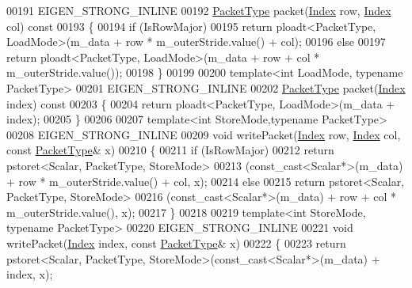 \begin{DoxyCode}
00191   EIGEN\_STRONG\_INLINE
00192   \hyperlink{struct_eigen_1_1_packet_type}{PacketType} packet(\hyperlink{namespace_eigen_a62e77e0933482dafde8fe197d9a2cfde}{Index} row, \hyperlink{namespace_eigen_a62e77e0933482dafde8fe197d9a2cfde}{Index} col)\textcolor{keyword}{ const}
00193 \textcolor{keyword}{  }\{
00194     \textcolor{keywordflow}{if} (IsRowMajor)
00195       \textcolor{keywordflow}{return} ploadt<PacketType, LoadMode>(m\_data + row * m\_outerStride.value() + col);
00196     \textcolor{keywordflow}{else}
00197       \textcolor{keywordflow}{return} ploadt<PacketType, LoadMode>(m\_data + row + col * m\_outerStride.value());
00198   \}
00199 
00200   \textcolor{keyword}{template}<\textcolor{keywordtype}{int} LoadMode, \textcolor{keyword}{typename} PacketType>
00201   EIGEN\_STRONG\_INLINE
00202   \hyperlink{struct_eigen_1_1_packet_type}{PacketType} packet(\hyperlink{namespace_eigen_a62e77e0933482dafde8fe197d9a2cfde}{Index} index)\textcolor{keyword}{ const}
00203 \textcolor{keyword}{  }\{
00204     \textcolor{keywordflow}{return} ploadt<PacketType, LoadMode>(m\_data + index);
00205   \}
00206 
00207   \textcolor{keyword}{template}<\textcolor{keywordtype}{int} StoreMode,\textcolor{keyword}{typename} PacketType>
00208   EIGEN\_STRONG\_INLINE
00209   \textcolor{keywordtype}{void} writePacket(\hyperlink{namespace_eigen_a62e77e0933482dafde8fe197d9a2cfde}{Index} row, \hyperlink{namespace_eigen_a62e77e0933482dafde8fe197d9a2cfde}{Index} col, \textcolor{keyword}{const} \hyperlink{struct_eigen_1_1_packet_type}{PacketType}& x)
00210   \{
00211     \textcolor{keywordflow}{if} (IsRowMajor)
00212       \textcolor{keywordflow}{return} pstoret<Scalar, PacketType, StoreMode>
00213                 (\textcolor{keyword}{const\_cast<}Scalar*\textcolor{keyword}{>}(m\_data) + row * m\_outerStride.value() + col, x);
00214     \textcolor{keywordflow}{else}
00215       \textcolor{keywordflow}{return} pstoret<Scalar, PacketType, StoreMode>
00216                     (\textcolor{keyword}{const\_cast<}Scalar*\textcolor{keyword}{>}(m\_data) + row + col * m\_outerStride.value(), x);
00217   \}
00218 
00219   \textcolor{keyword}{template}<\textcolor{keywordtype}{int} StoreMode, \textcolor{keyword}{typename} PacketType>
00220   EIGEN\_STRONG\_INLINE
00221   \textcolor{keywordtype}{void} writePacket(\hyperlink{namespace_eigen_a62e77e0933482dafde8fe197d9a2cfde}{Index} index, \textcolor{keyword}{const} \hyperlink{struct_eigen_1_1_packet_type}{PacketType}& x)
00222   \{
00223     \textcolor{keywordflow}{return} pstoret<Scalar, PacketType, StoreMode>(\textcolor{keyword}{const\_cast<}Scalar*\textcolor{keyword}{>}(m\_data) + index, x);

\end{DoxyCode}
